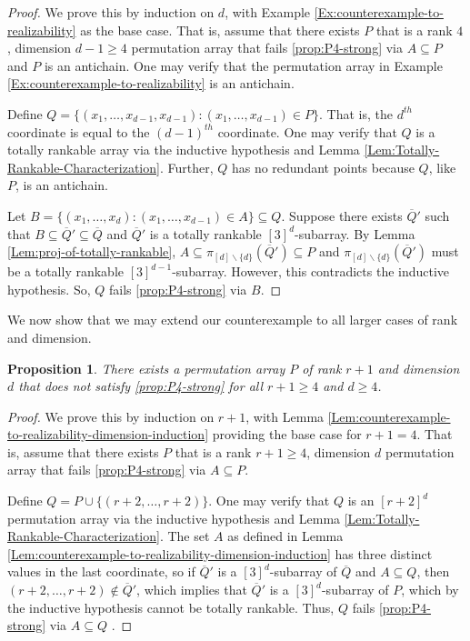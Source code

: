 \documentclass{amsart}
\newtheorem{proposition}[theorem]{Proposition}
\begin{document}
	\begin{proof}
		We prove this by induction on $d$, with Example \ref{Ex:counterexample-to-realizability} as the base case. That is, assume that there exists $P$ that is a rank $4$, dimension $d-1 \geq 4$ permutation array that fails \ref{prop:P4-strong} via $A \subseteq P$ and $P$ is an antichain. One may verify that the permutation array in Example \ref{Ex:counterexample-to-realizability} is an antichain.
		
		Define $Q = \{ (x_1, \ldots, x_{d-1}, x_{d-1}) : (x_1, \ldots, x_{d-1}) \in P \}$. That is, the $d^{th}$ coordinate is equal to the $(d-1)^{th}$ coordinate. One may verify that $Q$ is a totally rankable array via the inductive hypothesis and Lemma \ref{Lem:Totally-Rankable-Characterization}. Further, $Q$ has no redundant points because $Q$, like $P$, is an antichain.
		
		Let $B = \{ (x_1, \ldots, x_{d}) : (x_1, \ldots, x_{d-1}) \in A \} \subseteq Q$. Suppose there exists $\overline{Q}'$ such that $B \subseteq \overline{Q}' \subseteq \overline{Q}$ and $\overline{Q}'$ is a totally rankable $[3]^d$-subarray. By Lemma \ref{Lem:proj-of-totally-rankable}, $A \subseteq \pi_{[d] \backslash \{d \}}(\overline{Q}') \subseteq P$ and $\pi_{[d] \backslash \{d \}}(\overline{Q}')$ must be a totally rankable $[3]^{d-1}$-subarray. However, this contradicts the inductive hypothesis. So, $Q$ fails \ref{prop:P4-strong} via $B$.
	\end{proof}
	
	We now show that we may extend our counterexample to all larger cases of rank and dimension.
	
	\begin{proposition}
		There exists a permutation array $P$ of rank $r+1$ and dimension $d$ that does not satisfy \ref{prop:P4-strong} for all $r+1 \geq 4$ and $d \geq 4$.
		\label{Prop:counterexample-to-realizability-rank-induction}
	\end{proposition}
	
	\begin{proof}
		We prove this by induction on $r+1$, with Lemma \ref{Lem:counterexample-to-realizability-dimension-induction} providing the base case for $r+1 = 4$. That is, assume that there exists $P$ that is a rank $r+1 \geq 4$, dimension $d$ permutation array that fails \ref{prop:P4-strong} via $A \subseteq P$.
		
		Define $Q = P \cup \{ (r+2, \ldots, r+2) \}$. One may verify that $Q$ is an $[r+2]^d$ permutation array via the inductive hypothesis and Lemma \ref{Lem:Totally-Rankable-Characterization}. The set $A$ as defined in Lemma \ref{Lem:counterexample-to-realizability-dimension-induction} has three distinct values in the last coordinate, so if $\overline{Q}'$ is a $[3]^d$-subarray of $\overline{Q}$ and $A \subseteq Q$, then $(r+2, \ldots, r+2) \not \in \overline{Q}'$, which implies that $\overline{Q}'$ is a $[3]^d$-subarray of $P$, which by the inductive hypothesis cannot be totally rankable. Thus, $Q$ fails \ref{prop:P4-strong} via $A \subseteq Q$ .
	\end{proof}
	
\end{document}
